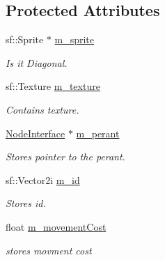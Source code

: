 \subsection*{Protected Attributes}
\begin{DoxyCompactItemize}
\item 
sf\+::\+Sprite $\ast$ \mbox{\hyperlink{class_node_interface_a11c603f391c23f2ea6c7ff228f8f40e6}{m\+\_\+sprite}}
\begin{DoxyCompactList}\small\item\em Is it Diagonal. \end{DoxyCompactList}\item 
\mbox{\label{class_node_interface_ac3ba2fd8d5ec51b3432a6092d059131a}} 
sf\+::\+Texture \mbox{\hyperlink{class_node_interface_ac3ba2fd8d5ec51b3432a6092d059131a}{m\+\_\+texture}}
\begin{DoxyCompactList}\small\item\em Contains texture. \end{DoxyCompactList}\item 
\mbox{\label{class_node_interface_a221bbac677de84cd72b03ec14322f6d4}} 
\mbox{\hyperlink{class_node_interface}{Node\+Interface}} $\ast$ \mbox{\hyperlink{class_node_interface_a221bbac677de84cd72b03ec14322f6d4}{m\+\_\+perant}}
\begin{DoxyCompactList}\small\item\em Stores pointer to the perant. \end{DoxyCompactList}\item 
\mbox{\label{class_node_interface_a90b046dd5869a936ecfd91e381693d50}} 
sf\+::\+Vector2i \mbox{\hyperlink{class_node_interface_a90b046dd5869a936ecfd91e381693d50}{m\+\_\+id}}
\begin{DoxyCompactList}\small\item\em Stores id. \end{DoxyCompactList}\item 
\mbox{\label{class_node_interface_a4d839e467a94e8f68d0a92dd63d51c58}} 
float \mbox{\hyperlink{class_node_interface_a4d839e467a94e8f68d0a92dd63d51c58}{m\+\_\+movement\+Cost}}
\begin{DoxyCompactList}\small\item\em stores movment cost \end{DoxyCompactList}\item 

\end{DoxyCompactItemize}
